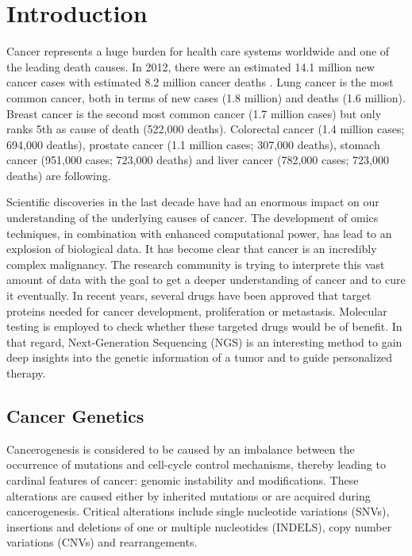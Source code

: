 \section{Introduction}

  Cancer represents a huge burden for health care systems worldwide and one of
  the leading death causes. In 2012, there were an estimated 14.1 million new
  cancer cases with estimated  8.2 million cancer deaths
  {\cite{cancer_stats_worldwide:2012}}. Lung cancer is the most common cancer,
  both in terms of new cases (1.8 million) and deaths (1.6 million). Breast
  cancer is the second most common cancer (1.7 million cases) but only ranks 5th
  as cause of death (522,000 deaths). Colorectal cancer (1.4 million cases;
  694,000 deaths), prostate cancer (1.1 million cases; 307,000 deaths), stomach
  cancer (951,000 cases; 723,000 deaths) and liver cancer (782,000 cases;
  723,000 deaths) are following.

  Scientific discoveries in the last decade have had an enormous impact on our
  understanding of the underlying causes of cancer. The development of omics
  techniques, in combination with enhanced computational power, has lead to an
  explosion of biological data. It has become clear that cancer is an incredibly
  complex malignancy. The research community is trying to interprete this vast
  amount of data with the goal to get a deeper understanding of cancer and to
  cure it eventually. In recent years, several drugs have been approved that
  target proteins needed for cancer development, proliferation or metastasis.
  Molecular testing is employed to check whether these targeted drugs would be
  of benefit. In that regard, Next-Generation Sequencing (NGS) is an interesting
  method to gain deep insights into the genetic information of a tumor and to
  guide personalized therapy.

  \subsection{Cancer Genetics}

    Cancerogenesis is considered to be caused by an imbalance between the
    occurrence of mutations and cell-cycle control mechanisms, thereby leading
    to cardinal features of cancer: genomic instability and modifications. These
    alterations are caused either by inherited mutations or are acquired during
    cancerogenesis. Critical alterations include single nucleotide variations
    (SNVs), insertions and deletions of one or multiple nucleotides (INDELS),
    copy number variations (CNVs) and rearrangements.

